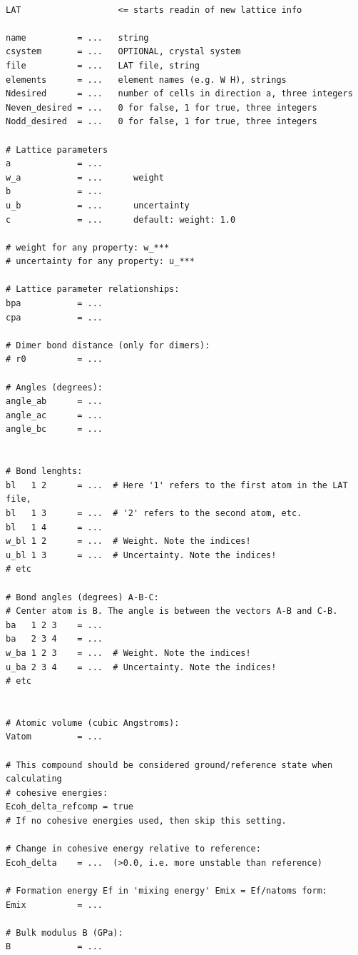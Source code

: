 \documentclass[a4paper,12pt,pdftex,onecolumn]{article}
\begin{document}
\begin{Verbatim}[fontsize=\relsize{-1},frame=single]

LAT                   <= starts readin of new lattice info

name          = ...   string
csystem       = ...   OPTIONAL, crystal system
file          = ...   LAT file, string
elements      = ...   element names (e.g. W H), strings
Ndesired      = ...   number of cells in direction a, three integers
Neven_desired = ...   0 for false, 1 for true, three integers
Nodd_desired  = ...   0 for false, 1 for true, three integers

# Lattice parameters
a             = ...
w_a           = ...      weight
b             = ...      
u_b           = ...      uncertainty
c             = ...      default: weight: 1.0

# weight for any property: w_***
# uncertainty for any property: u_***

# Lattice parameter relationships:
bpa           = ...
cpa           = ...

# Dimer bond distance (only for dimers):
# r0          = ...

# Angles (degrees):
angle_ab      = ...
angle_ac      = ...
angle_bc      = ...


# Bond lenghts:
bl   1 2      = ...  # Here '1' refers to the first atom in the LAT file,
bl   1 3      = ...  # '2' refers to the second atom, etc.
bl   1 4      = ...
w_bl 1 2      = ...  # Weight. Note the indices!
u_bl 1 3      = ...  # Uncertainty. Note the indices!
# etc

# Bond angles (degrees) A-B-C:
# Center atom is B. The angle is between the vectors A-B and C-B.
ba   1 2 3    = ...
ba   2 3 4    = ...
w_ba 1 2 3    = ...  # Weight. Note the indices!
u_ba 2 3 4    = ...  # Uncertainty. Note the indices!
# etc


# Atomic volume (cubic Angstroms):
Vatom         = ...

# This compound should be considered ground/reference state when calculating
# cohesive energies:
Ecoh_delta_refcomp = true
# If no cohesive energies used, then skip this setting.

# Change in cohesive energy relative to reference:
Ecoh_delta    = ...  (>0.0, i.e. more unstable than reference)

# Formation energy Ef in 'mixing energy' Emix = Ef/natoms form:
Emix          = ...

# Bulk modulus B (GPa):
B             = ...


\end{Verbatim}
\end{document}
